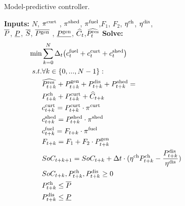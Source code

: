 \documentclass{article}
\begin{document}
\begin{algorithm}[t]
	\caption{Model-predictive controller.}
	\begin{algorithmic}[1]
		\STATE \textbf{Inputs:} $N$, $\pi^{\text{curt}}$ , $\pi^{\text{shed}}$, $\pi^{\text{fuel}}$,$F_1$, $F_2$, $\eta^{\text{ch}}$, $\eta^{\text{dis}}$, \\
		$\overline{P}$, $\underline{P}$, $\overline{S}$, $\overline{P^\text{gen}}$ , $\underline{P^\text{gen}}$, $\widehat{C}_{t}$,$\widehat{P^\text{res}_{t}}$
		\STATE \textbf{Solve:}
		\begin{align}
	\hspace{-12pt}	\min &  \sum_{k=0}^{N} \OPduration \big(\OPcost{fuel}_t + \OPcost{curt}_t + \OPcost{shed}_t \big)&&& \nonumber\\
	\hspace{-12pt}s.t. & \forall k \in \{0,...,N-1 \}: \nonumber \\
	    & \widehat{\nonSteerable_{t+k}} + \steer_{t+k} + \discharge_{t+k} + \shed_{t+k}=&&\nonumber\\
        &\hspace{0pt}\charge_{t+k} + \curtail_{t+k}  + \widehat{\nonFlexible}_{t+k} \hspace{28pt} &&\nonumber\\
        &\OPcost{curt}_{t+k} = \curtail_{t+k} \cdot \OPprice{curt} \hspace{38pt} &&\nonumber\\
        &\OPcost{shed}_{t+k} = \shed_{t+k} \cdot \OPprice{shed} \hspace{35pt}&&\nonumber\\
        &\OPcost{fuel}_{t+k} = F_{t+k} \cdot \OPprice{fuel} \hspace{38pt}&&\nonumber\\
        &F_{t+k} = F_1 + F_2 \cdot \steer_{t+k} \hspace{20pt}&&\nonumber\\
        &SoC_{t+k+1} = SoC_{t+k}+ \Delta t  \cdot(\chargeEfficienty \charge_{t+k} -  \frac{\discharge_{t+k}}{\dischargeEfficienty}) \hspace{40pt}&\nonumber\\
        &SoC_{t+k}, \charge_{t+k}, \discharge_{t+k} \geq 0 \hspace{5pt}&&\nonumber\\
        &\charge_{t+k} \leq \chargerate \hspace{75pt}&&\nonumber\\
        &\discharge_{t+k} \leq \dischargerate \hspace{75pt} &&\nonumber\\

\end{align}
\end{algorithmic}
\end{algorithm}
\end{document}
